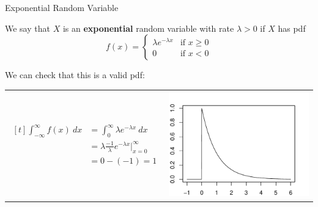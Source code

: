 \documentclass[handout]{beamer}
\renewcommand{\emph}{\textbf}
\begin{document}
\begin{frame}{Exponential Random Variable}
\begin{block}{}
We say that $X$ is an \emph{exponential} random variable with rate $\lambda>0$ if $X$ has pdf
$$f(x) = \begin{cases}\lambda e^{-\lambda x} & \text{if }x\geq 0 \\ 0 & \text{if }x<0\end{cases}$$
\end{block}
\pause We can check that this is a valid pdf:

\begin{tabular}{p{5.5cm}p{4cm}}
\vspace{0cm}
$\begin{aligned}[t]
\int_{-\infty}^\infty f(x)\ dx &= \int_0^\infty \lambda e^{-\lambda x}\ dx \\
&= \lambda \frac{-1}\lambda e^{-\lambda x}\Big\vert_{x=0}^\infty\\
&= 0 - (-1) = 1
\end{aligned}$
&
\vspace{-.25cm}
\includegraphics[scale=.55]{ch4_pdf_exp.pdf}
\end{tabular}
\end{frame}
\end{document}
